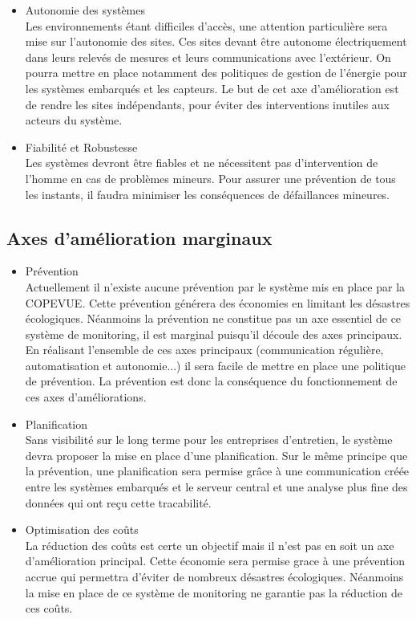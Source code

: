 \begin{itemize}
	\item Autonomie des systèmes \\

	Les environnements étant difficiles d'accès, une attention particulière sera mise sur l'autonomie des sites. Ces sites devant être autonome électriquement dans leurs relevés de mesures et leurs communications avec l'extérieur. On pourra mettre en place notamment des politiques de gestion de l'énergie pour les systèmes embarqués et les capteurs. Le but de cet axe d'amélioration est de rendre les sites indépendants, pour éviter des interventions inutiles aux acteurs du système.

	\item Fiabilité et Robustesse \\

	Les systèmes devront être fiables et ne nécessitent pas d'intervention de l'homme en cas de problèmes mineurs. Pour assurer une prévention de tous les instants, il faudra minimiser les conséquences de défaillances mineures.

\end{itemize}


\subsection{Axes d'amélioration marginaux}

\begin{itemize}
	\item Prévention \\

	Actuellement il n'existe aucune prévention par le système mis en place par la COPEVUE. Cette prévention générera des économies en limitant les désastres écologiques. Néanmoins la prévention ne constitue pas un axe essentiel de ce système de monitoring, il est marginal puisqu'il découle des axes principaux. En réalisant l'ensemble de ces axes principaux (communication régulière, automatisation et autonomie...) il sera facile de mettre en place une politique de prévention. La prévention est donc la conséquence du fonctionnement de ces axes d'améliorations.

	\item Planification \\

	Sans visibilité sur le long terme pour les entreprises d'entretien, le système devra proposer la mise en place d'une planification. Sur le même principe que la prévention, une planification sera permise grâce à une communication créée entre les systèmes embarqués et le serveur central et une analyse plus fine des données qui ont reçu cette tracabilité.

	\item Optimisation des coûts \\

	La réduction des coûts est certe un objectif mais il n'est pas en soit un axe d'amélioration principal. Cette économie sera permise grace à une prévention accrue qui permettra d'éviter de nombreux désastres écologiques. Néanmoins la mise en place de ce système de monitoring ne garantie pas la réduction de ces coûts.

\end{itemize}
